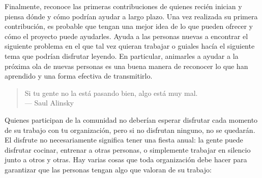 Finalmente,
reconoce las primeras contribuciones de quienes recién inician
y piensa dónde y cómo podrían ayudar a largo plazo.
Una vez realizada su primera contribución,
es probable que tengan una mejor idea de lo que pueden ofrecer
y cómo el proyecto puede ayudarles.
Ayuda a las personas nuevas a encontrar el siguiente problema en el que tal vez quieran trabajar
o guiales hacía el siguiente tema que podrían disfrutar leyendo.
En particular,
animarles a ayudar a la próxima ola de nuevas personas
es una buena manera de reconocer lo que han aprendido
y una forma efectiva de transmitirlo.


\begin{quote}

 Si tu gente no la está pasando bien, algo está muy mal.\\
  --- Saul Alinsky

\end{quote}

Quienes participan de la comunidad no deberían esperar disfrutar cada momento de su trabajo con tu organización,
pero si no disfrutan ninguno,
no se quedarán.
El disfrute no necesariamente significa tener una fiesta anual:
la gente puede disfrutar cocinar,
entrenar a otras personas,
o simplemente trabajar en silencio junto a otros y otras.
Hay varias cosas que toda organización debe hacer para garantizar
que las personas tengan algo que valoran de su trabajo:

